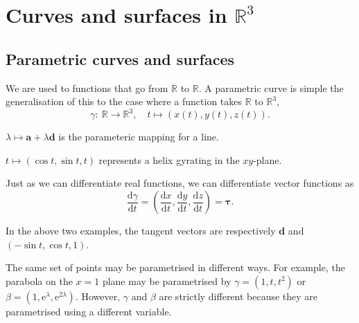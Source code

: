 \documentclass[10pt,notitlepage]{revtex4-1}
\newenvironment{example}[1][Example]{\begin{trivlist}
\item[\hskip \labelsep {\bfseries #1}]}{\end{trivlist}}
\newcommand{\ex}{\mathrm{e}}
\newcommand{\ab}{{\boldsymbol{a}}}
\newcommand{\db}{{\boldsymbol{d}}}
\begin{document}

\section{Curves and surfaces in $\mathbb{R}^3$}

\subsection{Parametric curves and surfaces}

We are used to functions that go from $\mathbb{R}$ to $\mathbb{R}$. A parametric
curve is simple the generalisation of this to the case where a function takes
$\mathbb{R}$ to $\mathbb{R}^3$,
\begin{equation}
	\gamma:\ \mathbb{R}\rightarrow\mathbb{R}^3,\quad
	t\mapsto(x(t),y(t),z(t)).
\end{equation}
\begin{example}
	$\lambda\mapsto\ab+\lambda\db$ is the parameteric mapping for a line.
\end{example}
\begin{example}
	$t\mapsto(\cos t,\sin t, t)$ represents a helix gyrating in the $xy$-plane.
\end{example}

Just as we can differentiate real functions, we can differentiate vector
functions as
\begin{equation}
	\frac{\mathrm{d}\gamma}{\mathrm{d}t}=\left(
	\frac{\mathrm{d}x}{\mathrm{d}t}, \frac{\mathrm{d}y}{\mathrm{d}t},
	\frac{\mathrm{d}z}{\mathrm{d}t}\right)=\boldsymbol{\tau}.
\end{equation}
\begin{example}
	In the above two examples, the tangent vectors are respectively $\db$ and
	$(-\sin t, \cos t,1)$.
\end{example}

The same set of points may be parametrised in different ways. For example, the
parabola on the $x=1$ plane may be parametrised by $\gamma=(1,t,t^2)$ or
$\beta=(1,\ex^\lambda,\ex^{2\lambda})$. However, $\gamma$ and $\beta$ are
strictly different because they are parametrised using a different variable.
\end{document}
